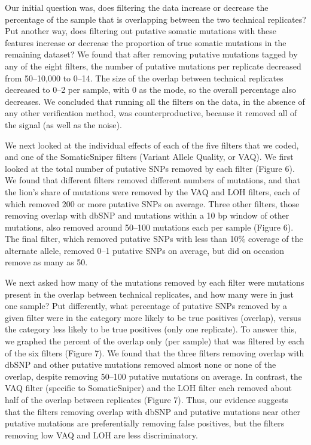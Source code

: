 \documentclass[11pt]{article} %
\begin{document}
Our initial question was, does filtering the data increase or decrease the percentage of the sample that is overlapping between the two technical replicates? Put another way, does filtering out putative somatic mutations with these features increase or decrease the proportion of true somatic mutations in the remaining dataset? We found that after removing putative mutations tagged by any of the eight filters, the number of putative mutations per replicate decreased from 50--10,000 to 0--14. The size of the overlap between technical replicates decreased to 0--2 per sample, with 0 as the mode, so the overall percentage also decreases. We concluded that running all the filters on the data, in the absence of any other verification method, was counterproductive, because it removed all of the signal (as well as the noise). 

We next looked at the individual effects of each of the five filters that we coded, and one of the SomaticSniper filters (Variant Allele Quality, or VAQ). We first looked at the total number of putative SNPs removed by each filter (Figure 6). We found that different filters removed different numbers of mutations, and that the lion's share of mutations were removed by the VAQ and LOH filters, each of which removed 200 or more putative SNPs on average. Three other filters, those removing overlap with dbSNP and mutations within a 10 bp window of other mutations, also removed around 50--100 mutations each per sample (Figure 6). The final filter, which removed putative SNPs with less than 10\% coverage of the alternate allele, removed 0--1 putative SNPs on average, but did on occasion remove as many as 50. 

We next asked how many of the mutations removed by each filter were mutations present in the overlap between technical replicates, and how many were in just one sample? Put differently, what percentage of putative SNPs removed by a given filter were in the category more likely to be true positives (overlap), versus the category less likely to be true positives (only one replicate). To answer this, we graphed the percent of the overlap only (per sample) that was filtered by each of the six filters (Figure 7). We found that the three filters removing overlap with dbSNP and other putative mutations removed almost none or none of the overlap, despite removing 50--100 putative mutations on average. In contrast, the VAQ filter (specific to SomaticSniper) and the LOH filter each removed about half of the overlap between replicates (Figure 7). Thus, our evidence suggests that the filters removing overlap with dbSNP and putative mutations near other putative mutations are preferentially removing false positives, but the filters removing low VAQ and LOH are less discriminatory. 
\end{document}
